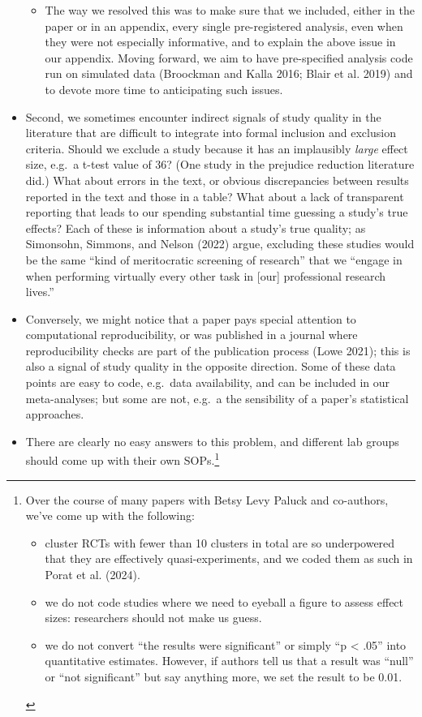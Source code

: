 \documentclass{article}
\providecommand{\tightlist}{%
  \setlength{\itemsep}{0pt}\setlength{\parskip}{0pt}}
\begin{document}
\begin{itemize}
  \begin{itemize}
  \tightlist
  \item
    The way we resolved this was to make sure that we included, either
    in the paper or in an appendix, every single pre-registered
    analysis, even when they were not especially informative, and to
    explain the above issue in our appendix. Moving forward, we aim to
    have pre-specified analysis code run on simulated data (Broockman
    and Kalla 2016; Blair et al. 2019) and to devote more time to
    anticipating such issues.
  \end{itemize}
\item
  Second, we sometimes encounter indirect signals of study quality in
  the literature that are difficult to integrate into formal inclusion
  and exclusion criteria. Should we exclude a study because it has an
  implausibly \emph{large} effect size, e.g.~a t-test value of 36? (One
  study in the prejudice reduction literature did.) What about errors in
  the text, or obvious discrepancies between results reported in the
  text and those in a table? What about a lack of transparent reporting
  that leads to our spending substantial time guessing a study's true
  effects? Each of these is information about a study's true quality; as
  Simonsohn, Simmons, and Nelson (2022) argue, excluding these studies
  would be the same ``kind of meritocratic screening of research'' that
  we ``engage in when performing virtually every other task in {[}our{]}
  professional research lives.''
\item
  Conversely, we might notice that a paper pays special attention to
  computational reproducibility, or was published in a journal where
  reproducibility checks are part of the publication process (Lowe
  2021); this is also a signal of study quality in the opposite
  direction. Some of these data points are easy to code, e.g.~data
  availability, and can be included in our meta-analyses; but some are
  not, e.g.~a the sensibility of a paper's statistical approaches.
\item
  There are clearly no easy answers to this problem, and different lab
  groups should come up with their own SOPs.\footnote{Over the course of
    many papers with Betsy Levy Paluck and co-authors, we've come up
    with the following:

    \begin{itemize}
    \item
      cluster RCTs with fewer than 10 clusters in total are so
      underpowered that they are effectively quasi-experiments, and we
      coded them as such in Porat et al. (2024).
    \item
      we do not code studies where we need to eyeball a figure to assess
      effect sizes: researchers should not make us guess.
    \item
      we do not convert ``the results were significant'' or simply ``p
      \textless{} .05'' into quantitative estimates. However, if authors
      tell us that a result was ``null'' or ``not significant'' but say
      anything more, we set the result to be 0.01.
    \end{itemize}

}
\end{itemize}
\end{document}
